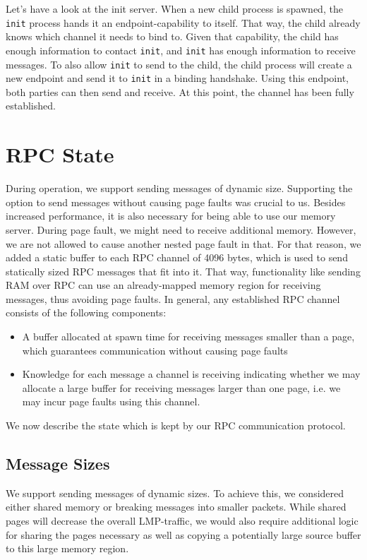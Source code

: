Let's have a look at the init server.
When a new child process is spawned, the \texttt{init} process hands it an endpoint-capability
to itself. That way, the child already knows which channel it needs to bind to. 
Given that capability, the child has enough information to contact \texttt{init}, and 
\texttt{init} has enough information to receive messages. To also allow \texttt{init}
to send to the child, the child process will create a new endpoint and send it to \texttt{init}
in a binding handshake. Using this endpoint, both parties can then send and receive.
At this point, the channel has been fully established.


\section{RPC State}
During operation, we support sending messages of dynamic size.
Supporting the option to send messages without causing page faults was crucial 
to us. Besides increased performance, it is also necessary for being able to use our memory server.
During page fault, we might need to receive additional memory. However, we are not allowed to cause another
nested page fault in that. For that reason, we added a static buffer to each RPC channel of 4096 bytes, 
which is used to send statically sized RPC messages that fit into it.
That way, functionality like sending RAM over RPC can use an already-mapped memory region for 
receiving messages, thus avoiding page faults. In general, any established 
RPC channel consists of the following components:

\begin{itemize}
    \item A buffer allocated at spawn time for receiving messages smaller than a page, which guarantees
    communication without causing page faults
    \item Knowledge for each message a channel is receiving indicating whether we may allocate a large
    buffer for receiving messages larger than one page, i.e. we may incur page faults using this channel.
\end{itemize}

We now describe the state which is kept by our RPC communication protocol.

\subsection{Message Sizes}
We support sending messages of dynamic sizes. To achieve this, we considered 
either shared memory or breaking messages into smaller packets.
While shared pages will decrease the overall LMP-traffic, we would also 
require additional logic for sharing the pages necessary as well as 
copying a potentially large source buffer to this large memory region.

